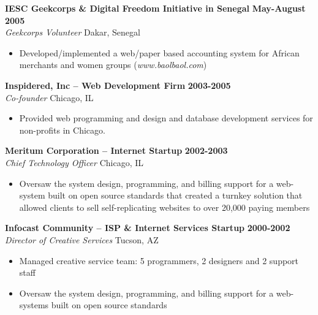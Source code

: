 \documentclass{res}
\begin{document}
\begin{resume}
\textbf{IESC Geekcorps \& Digital Freedom Initiative in Senegal} \hfill \textbf{May-August 2005} \\
\emph{Geekcorps Volunteer} \hfill Dakar, Senegal
 \begin{itemize} \itemsep -2pt
  \item  Developed/implemented a web/paper based accounting system for African merchants and women groups (\emph{www.baolbaol.com})
\end{itemize} \vspace{-6pt}

\textbf{Inspidered, Inc -- Web Development Firm} \hfill \textbf{2003-2005} \\
\emph{Co-founder} \hfill Chicago, IL
 \begin{itemize} \itemsep -2pt
  \item  Provided web programming and design and database development services for non-profits in Chicago. 
 \end{itemize} \vspace{-6pt}
 
\textbf{Meritum Corporation -- Internet Startup} \hfill \textbf{2002-2003} \\
\emph{Chief Technology Officer} \hfill Chicago, IL
 \begin{itemize} \itemsep -2pt
  \item Oversaw the system design, programming, and billing support for a web-system built on open source standards that created a 
	turnkey solution that allowed clients to sell self-replicating websites to over 20,000 paying members
\end{itemize} \vspace{-6pt}

\textbf{Infocast Community -- ISP \& Internet Services Startup} \hfill \textbf{2000-2002} \\
\emph{Director of Creative Services} \hfill Tucson, AZ
 \begin{itemize} \itemsep -2pt
  \item Managed creative service team: 5 programmers, 2 designers and 2 support staff
  \item Oversaw the system design, programming, and billing support for a web-systems built on open source standards
\end{itemize} \vspace{-6pt}


\end{resume}
\end{document}
